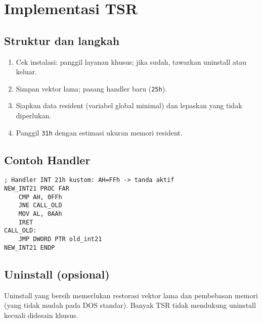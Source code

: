 \documentclass[../main.tex]{subfiles}
\begin{document}
        \section{Implementasi TSR}
            \subsection{Struktur dan langkah}
                \begin{enumerate}
                    \item Cek instalasi: panggil layanan khusus; jika sudah, tawarkan uninstall atau keluar.
                    \item Simpan vektor lama; pasang handler baru (\texttt{25h}).
                    \item Siapkan data resident (variabel global minimal) dan lepaskan yang tidak diperlukan.
                    \item Panggil \texttt{31h} dengan estimasi ukuran memori resident.
                \end{enumerate}

            \subsection{Contoh Handler}
                \begin{verbatim}
; Handler INT 21h kustom: AH=FFh -> tanda aktif
NEW_INT21 PROC FAR
    CMP AH, 0FFh
    JNE CALL_OLD
    MOV AL, 0AAh
    IRET
CALL_OLD:
    JMP DWORD PTR old_int21
NEW_INT21 ENDP
                \end{verbatim}

            \subsection{Uninstall (opsional)}
                Uninstall yang bersih memerlukan restorasi vektor lama dan pembebasan memori (yang tidak mudah pada DOS standar). Banyak TSR tidak mendukung uninstall kecuali didesain khusus.
\end{document}
